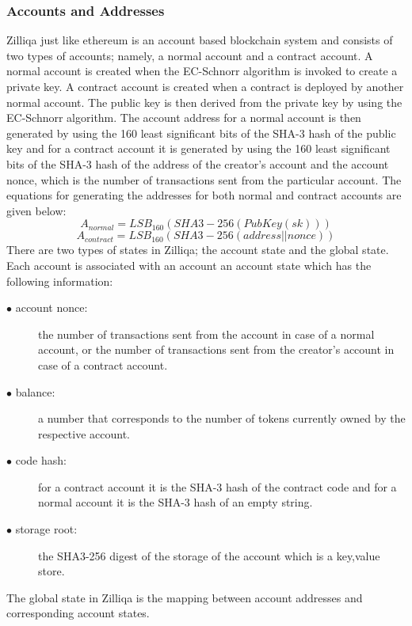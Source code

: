 \documentclass[a4paper,twoside,phd]{BYUPhys}
\begin{document}
\subsubsection{Accounts and Addresses}
Zilliqa just like ethereum is an account based blockchain system and consists of two types of accounts; namely, a normal account and a contract account. A normal account is created when the EC-Schnorr algorithm is invoked to create a private key. A contract account is created when a contract is deployed by another normal account. The public key is then derived from the private key by using the EC-Schnorr algorithm. The account address for a normal account is then generated by using the 160 least significant bits of the SHA-3 hash of the public key and for a contract account it is generated by using the 160 least significant bits of the SHA-3 hash of the address of the creator's account and the account nonce, which is the number of transactions sent from the particular account. The equations for generating the addresses for both normal and contract accounts are given below:
\begin{equation}
    A_{normal} = LSB_{160}(SHA3-256(PubKey(sk)))
\end{equation}
\begin{equation}
    A_{contract} = LSB_{160}(SHA3-256(address||nonce))
\end{equation}
There are two types of states in Zilliqa; the account state and the global state.
Each account is associated with an account an account state which has the following information:
\begin{description}
\item[$\bullet$ account nonce:] the number of transactions sent from the account in case of a normal account, or the number of transactions sent from the creator's account in case of a contract account.
\item[$\bullet$ balance:] a number that corresponds to the number of tokens currently owned by the respective account.
\item[$\bullet$ code hash:] for a contract account it is the SHA-3 hash of the contract code and for a normal account it is the SHA-3 hash of an empty string.
\item[$\bullet$ storage root:] the SHA3-256 digest of the storage of the account which is a key,value store.
\end{description}
The global state in Zilliqa is the mapping between account addresses and corresponding account states. 
\end{document}
